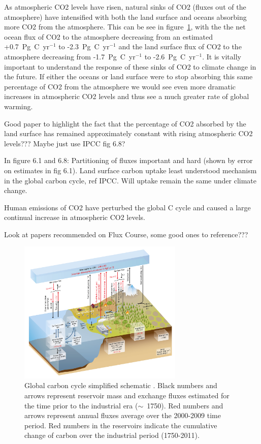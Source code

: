 \documentclass[11pt]{article}
\begin{document}
As atmospheric CO2 levels have risen, natural sinks of CO2 (fluxes out of the atmosphere) have intensified with both the land surface and oceans absorbing more CO2 from the atmosphere. This can be see in figure~\ref{fig:ipcc_fig6.1}, with the the net ocean flux of CO2 to the atmosphere decreasing from an estimated +0.7~Pg~C~yr\(^{-1}\) to -2.3~Pg~C~yr\(^{-1}\) and the land surface flux of CO2 to the atmosphere decreasing from -1.7~Pg~C~yr\(^{-1}\) to -2.6~Pg~C~yr\(^{-1}\). It is vitally important to understand the response of these sinks of CO2 to climate change in the future. If either the oceans or land surface were to stop absorbing this same percentage of CO2 from the atmosphere we would see even more dramatic increases in atmospheric CO2 levels and thus see a much greater rate of global warming.  

Good paper to highlight the fact that the percentage of CO2 absorbed by the land surface has remained approximately constant with rising atmospheric CO2 levels??? Maybe just use IPCC fig 6.8?

In figure 6.1 and 6.8: Partitioning of fluxes important and hard (shown by error on estimates in fig 6.1). Land surface carbon uptake least understood mechanism in the global carbon cycle, ref IPCC. Will uptake remain the same under climate change.

Human emissions of CO2 have perturbed the global C cycle and caused a large continual increase in atmospheric CO2 levels.

Look at papers recommended on Flux Course, some good ones to reference???

\begin{figure}[ht]
    \centering
    \includegraphics[width=0.7\textwidth]{ipcc_fig6_1.jpg}
    \caption{Global carbon cycle simplified schematic \citep{ciais2014carbon}. Black numbers and arrows represent reservoir mass and exchange fluxes estimated for the time prior to the industrial era (\(\sim\)~1750). Red numbers and arrows represent annual fluxes average over the 2000-2009 time period. Red numbers in the reservoirs indicate the cumulative change of carbon over the industrial period (1750-2011).}
    \label{fig:ipcc_fig6.1}
\end{figure}
\end{document}
